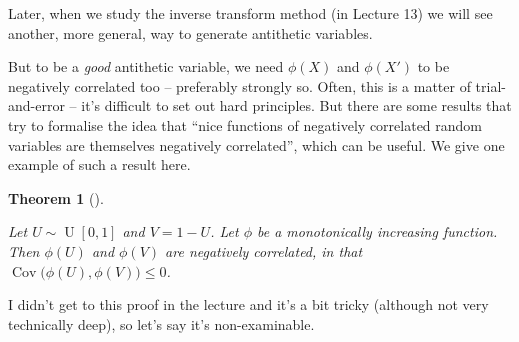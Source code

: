 \documentclass[
  letterpaper,
  DIV=11,
  numbers=noendperiod]{scrreprt}
\theoremstyle{plain}
\newtheorem{theorem}{Theorem}[chapter]
\theoremstyle{definition}
\theoremstyle{definition}
\theoremstyle{remark}
\begin{document}
Later, when we study the inverse transform method (in Lecture 13) we
will see another, more general, way to generate antithetic variables.

But to be a \emph{good} antithetic variable, we need \(\phi(X)\) and
\(\phi(X')\) to be negatively correlated too -- preferably strongly so.
Often, this is a matter of trial-and-error -- it's difficult to set out
hard principles. But there are some results that try to formalise the
idea that ``nice functions of negatively correlated random variables are
themselves negatively correlated'', which can be useful. We give one
example of such a result here.

\begin{theorem}[]\protect\hypertarget{thm-neg}{}\label{thm-neg}

Let \(U \sim \operatorname{U}[0, 1]\) and \(V = 1 - U\). Let \(\phi\) be
a monotonically increasing function. Then \(\phi(U)\) and \(\phi(V)\)
are negatively correlated, in that
\(\operatorname{Cov}\big(\phi(U), \phi(V)\big) \leq 0\).

\end{theorem}

I didn't get to this proof in the lecture and it's a bit tricky
(although not very technically deep), so let's say it's non-examinable.
\end{document}
